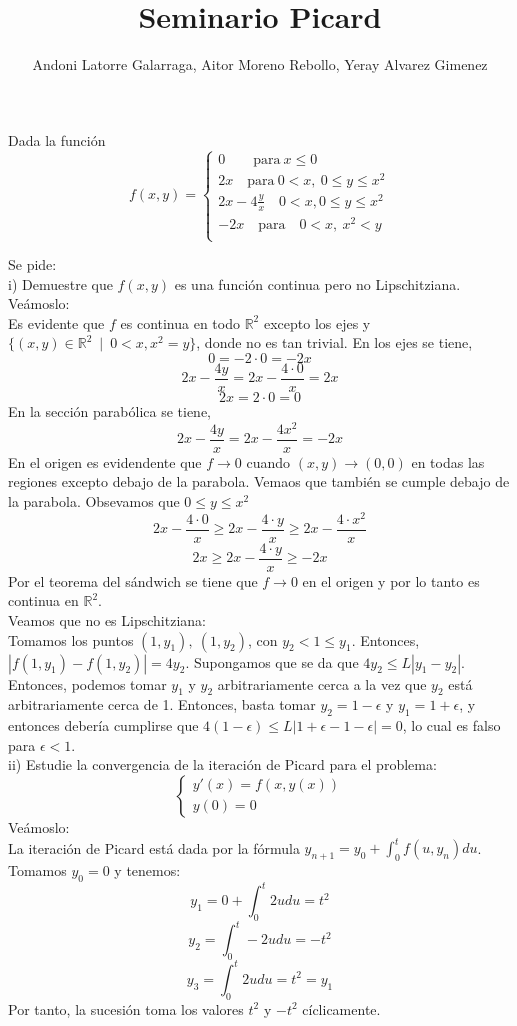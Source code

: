 \documentclass{article}
\title{Seminario Picard}
\author{\textcolor{WildStrawberry}{Andoni Latorre Galarraga, Aitor Moreno Rebollo, Yeray Alvarez Gimenez}}
\date{}
\newcommand{\bb}[1]{\mathbb{#1}}
\begin{document}
\maketitle

Dada la función\\
$$
f(x, y) = \left \{ \begin{matrix}
    0 \qquad \text{para} \ x \leq 0 \\
    2x \quad \text{para} \ 0 <x, \ 0\leq y \leq x^2 \\
    2x - 4\frac{y}{x} \quad 0<x, 0 \leq y \leq x^2  \\
    -2x \quad \text{para} \quad 0<x, \ x^2 < y \\
\end{matrix} \right .
$$

Se pide:\\
i) Demuestre que $f(x, y)$ es una función continua pero no Lipschitziana.\\
Veámoslo:\\
Es evidente que $f$ es continua en todo $\bb{R}^2$ excepto los ejes y $\{ (x,y)\in \bb{R}^2 \:\mid\: 0<x, x^2=y \}$, donde no es tan trivial. En los ejes se tiene,
$$
0 = -2 \cdot 0 = -2x
$$
$$
2x-\frac{4y}{x} = 2x- \frac{4\cdot 0}{x} = 2x
$$
$$
2x=2\cdot 0 = 0
$$
En la sección parabólica se tiene,
$$
2x-\frac{4 y}{x} = 2x - \frac{4x^2}{x} = -2x
$$
En el origen es evidendente que $f\to 0$ cuando $(x,y)\to (0,0)$ en todas las regiones excepto debajo de la parabola. Vemaos que también se cumple debajo de la parabola. Obsevamos que $0\le y \le x^2$
$$
2x-\frac{4\cdot 0}{x} \ge 2x-\frac{4\cdot y}{x} \ge 2x-\frac{4\cdot x^2}{x}
$$
$$
2x \ge 2x-\frac{4\cdot y}{x} \ge -2x
$$
Por el teorema del sándwich se tiene que $f\to 0$ en el origen y por lo tanto es continua en $\bb{R}^2$.\\
Veamos que no es Lipschitziana:\\
Tomamos los puntos $(1, y_1), \ (1, y_2)$, con $y_2 < 1 \leq y_1$. Entonces, $|f(1, y_1) - f(1, y_2)| = 4y_2$. Supongamos que se da que $4y_2 \leq L|y_1 - y_2|$. Entonces, podemos tomar $y_1$ y $y_2$ arbitrariamente cerca a la vez que $y_2$ está arbitrariamente cerca de 1. Entonces, basta tomar $y_2 = 1 - \epsilon$ y $y_1 = 1 + \epsilon$, y entonces debería cumplirse que $4(1 - \epsilon) \leq L|1 + \epsilon - 1 - \epsilon| = 0$, lo cual es falso para $\epsilon < 1$.\\

ii) Estudie la convergencia de la iteración de Picard para el problema:\\
$$
\left \{ \begin{matrix}
    y'(x) = f(x, y(x)) \\
    y(0) = 0
\end{matrix} \right .
$$
Veámoslo:\\
La iteración de Picard está dada por la fórmula $y_{n + 1} = y_0 + \int_0^t f(u, y_n) du$. Tomamos $y_0 = 0$ y tenemos:\\
$$
y_1 = 0 + \int_0^t2udu = t^2
$$
$$
y_2 = \int_0^t-2udu = -t^2
$$
$$
y_3 = \int_0^t2udu = t^2 = y_1
$$
Por tanto, la sucesión toma los valores $t^2$ y $-t^2$ cíclicamente.
\end{document}
